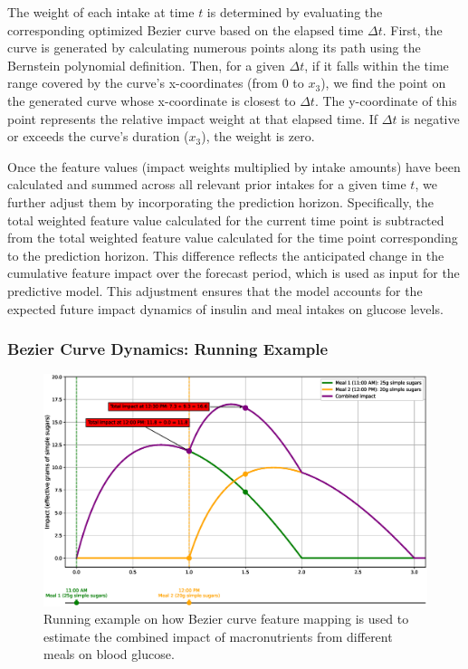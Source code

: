 The weight of each intake at time \( t \) is determined by evaluating the corresponding optimized Bezier curve based on the elapsed time \( \Delta t \). First, the curve is generated by calculating numerous points along its path using the Bernstein polynomial definition. Then, for a given \( \Delta t \), if it falls within the time range covered by the curve's x-coordinates (from 0 to \( x_3 \)), we find the point on the generated curve whose x-coordinate is closest to \( \Delta t \). The y-coordinate of this point represents the relative impact weight at that elapsed time. If \( \Delta t \) is negative or exceeds the curve's duration (\(x_3\)), the weight is zero.

Once the feature values (impact weights multiplied by intake amounts) have been calculated and summed across all relevant prior intakes for a given time \(t\), we further adjust them by incorporating the prediction horizon. Specifically, the total weighted feature value calculated for the current time point is subtracted from the total weighted feature value calculated for the time point corresponding to the prediction horizon. This difference reflects the anticipated change in the cumulative feature impact over the forecast period, which is used as input for the predictive model. This adjustment ensures that the model accounts for the expected future impact dynamics of insulin and meal intakes on glucose levels.

\subsubsection{Bezier Curve Dynamics: Running Example}

\begin{figure}[h]
\includegraphics[width=\linewidth]{images/methods/example_bezier.eps}
\caption{Running example on how Bezier curve feature mapping is used to estimate the combined impact of macronutrients from different meals on blood glucose.}
\label{fig:bezier_curve}
\end{figure}


